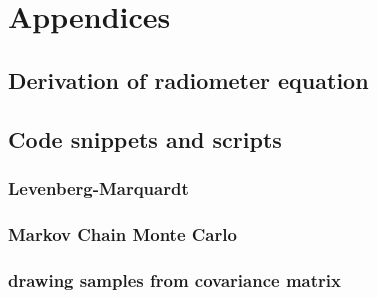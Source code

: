 \documentclass[12pt, TexShade, letterpaper]{report}
\begin{document}
\chapter{Appendices}
\section{Derivation of radiometer equation}
\section{Code snippets and scripts}	
\subsection{Levenberg-Marquardt}
\label{chap:appendix,sub:LM}
\subsection{Markov Chain Monte Carlo}
\label{chap:appendix,sub:MCMC}
\subsection{drawing samples from covariance matrix}
\label{chap:appendix,sub:draw}

	{
	
	
	
	
	}
\end{document}
